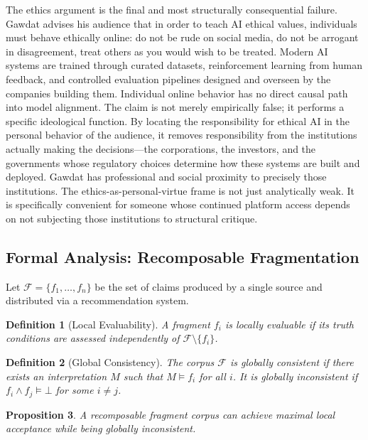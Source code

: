 \documentclass[12pt, a4paper]{article}
\newtheorem{definition}{Definition}[section]
\newtheorem{proposition}[definition]{Proposition}
\begin{document}
The ethics argument is the final and most structurally consequential failure. Gawdat advises his
audience that in order to teach AI ethical values, individuals must behave ethically online: do not
be rude on social media, do not be arrogant in disagreement, treat others as you would wish to be
treated. Modern AI systems are trained through curated datasets, reinforcement learning from human
feedback, and controlled evaluation pipelines designed and overseen by the companies building them.
Individual online behavior has no direct causal path into model alignment. The claim is not merely
empirically false; it performs a specific ideological function. By locating the responsibility for
ethical AI in the personal behavior of the audience, it removes responsibility from the institutions
actually making the decisions---the corporations, the investors, and the governments whose
regulatory choices determine how these systems are built and deployed. Gawdat has professional and
social proximity to precisely those institutions. The ethics-as-personal-virtue frame is not just
analytically weak. It is specifically convenient for someone whose continued platform access
depends on not subjecting those institutions to structural critique.

\subsection{Formal Analysis: Recomposable Fragmentation}

Let $\mathcal{F} = \{f_1, \dots, f_n\}$ be the set of claims produced by a single source and
distributed via a recommendation system.

\begin{definition}[Local Evaluability]
A fragment $f_i$ is locally evaluable if its truth conditions are assessed independently of
$\mathcal{F} \setminus \{f_i\}$.
\end{definition}

\begin{definition}[Global Consistency]
The corpus $\mathcal{F}$ is globally consistent if there exists an interpretation $M$ such that
$M \models f_i$ for all $i$. It is globally inconsistent if $f_i \wedge f_j \models \bot$ for some
$i \neq j$.
\end{definition}

\begin{proposition}
A recomposable fragment corpus can achieve maximal local acceptance while being globally
inconsistent.
\end{proposition}
\end{document}
